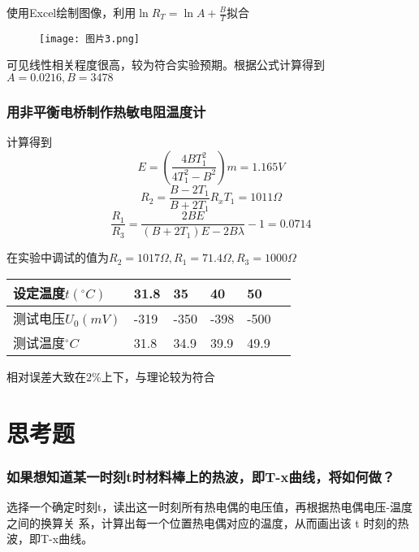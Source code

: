 \documentclass[11pt,a4paper]{article}
\begin{document}
    使用Excel绘制图像，利用$\ln {R_T} = \ln A + \frac{B}{T}$拟合
    \begin{figure}[H]
        \centering
        \texttt{[image: 图片3.png]}
    \end{figure}

    可见线性相关程度很高，较为符合实验预期。根据公式计算得到$A=0.0216,B=3478$

    \subsubsection{用非平衡电桥制作热敏电阻温度计}
    计算得到
    \begin{equation}
        E = \left( {\frac{{4BT_1^2}}{{4T_1^2 - {B^2}}}} \right)m = 1.165V
    \end{equation}
    \begin{equation}
        {R_2} = \frac{{B - 2{T_1}}}{{B + 2{T_1}}}{R_x}{T_1} = 1011\Omega 
    \end{equation}
    \begin{equation}
        \frac{{{R_1}}}{{{R_3}}} = \frac{{2BE}}{{\left( {B + 2{T_1}} \right)E - 2B\lambda }} - 1=0.0714
    \end{equation}

    在实验中调试的值为$R_2=1017\Omega,R_1=71.4\Omega,R_3=1000\Omega$
    \begin{table}[H]
        \centering
        \begin{tabular}{|l|l|l|l|l|l|}
        \hline
            设定温度$t(^{\circ}C)$ & 31.8 & 35 & 40 & 50 \\ \hline
            测试电压$U_0(mV)$ & -319 & -350 & -398 & -500  \\ \hline
            测试温度$^{\circ}C$ & 31.8& 34.9 & 39.9 & 49.9 \\ \hline
        \end{tabular}
    \end{table}

    相对误差大致在$2\%$上下，与理论较为符合
    
\section{思考题}
    \subsubsection*{如果想知道某一时刻t时材料棒上的热波，即T-x曲线，将如何做？}
    选择一个确定时刻t，读出这一时刻所有热电偶的电压值，再根据热电偶电压-温度之间的换算关
    系，计算出每一个位置热电偶对应的温度，从而画出该 t 时刻的热波，即T-x曲线。
\end{document}
